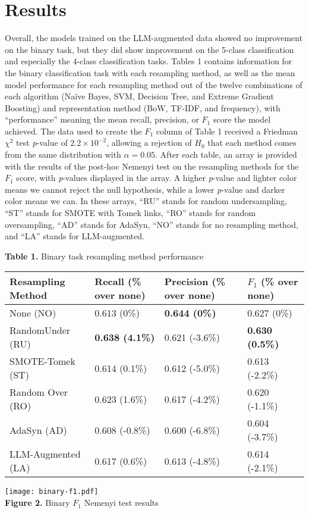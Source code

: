 \documentclass[runningheads]{llncs}
\newenvironment{nscenter}
 {\parskip=0pt\par\nopagebreak\centering}
 {\par\noindent\ignorespacesafterend}
\begin{document}
{\parskip=0pt
\section{Results}
Overall, the models trained on the LLM-augmented data showed no improvement on the binary task, but they did show improvement on the 5-class classification and especially the 4-class classification tasks. Tables 1 contains information for the binary classification task with each resampling method, as well as the mean model performance for each resampling method out of the twelve combinations of each algorithm (Naïve Bayes, SVM, Decision Tree, and Extreme Gradient Boosting) and representation method (BoW, TF-IDF, and frequency), with ``performance'' meaning the mean recall, precision, or $F_1$ score the model achieved. The data used to create the $F_1$ column of Table 1 received a Friedman $\chi^2$ test \emph{p}-value of $2.2 \times 10^{-2}$, allowing a rejection of $H_0$ that each method comes from the same distribution with $\alpha=0.05$. After each table, an array is provided with the results of the post-hoc Nemenyi test on the resampling methods for the $F_1$ score, with \emph{p}-values displayed in the array. A higher \emph{p}-value and lighter color means we cannot reject the null hypothesis, while a lower \emph{p}-value and darker color means we can. In these arrays, ``RU'' stands for random undersampling, ``ST'' stands for SMOTE with Tomek links, ``RO'' stands for random oversampling, ``AD'' stands for AdaSyn, ``NO'' stands for no resampling method, and ``LA'' stands for LLM-augmented.}
\clearpage
\begin{nscenter}
{\bf Table 1.} Binary task resampling method performance\\

\begin{tabular}{|l|l|l|l|}
\hline
Resampling Method & Recall (\% over none) & Precision (\% over none) & $F_1$ (\% over none) \\\hline
 None (NO) & 0.613 (0\%) & {\bf 0.644 (0\%)} & 0.627 (0\%) \\\hline
 RandomUnder (RU) & {\bf 0.638 (4.1\%)} & 0.621 (-3.6\%) & {\bf 0.630 (0.5\%)} \\\hline
 SMOTE-Tomek (ST) & 0.614 (0.1\%) & 0.612 (-5.0\%) & 0.613 (-2.2\%) \\\hline
 Random Over (RO) & 0.623 (1.6\%) & 0.617 (-4.2\%) & 0.620 (-1.1\%) \\\hline
 AdaSyn (AD) & 0.608 (-0.8\%) & 0.600 (-6.8\%) & 0.604 (-3.7\%) \\\hline
 LLM-Augmented (LA) & 0.617 (0.6\%) & 0.613 (-4.8\%) & 0.614 (-2.1\%) \\\hline
\end{tabular}

\texttt{[image: binary-f1.pdf]}\\
{\bf Figure 2.} Binary $F_1$ Nemenyi test results\\
\end{nscenter}
\end{document}
